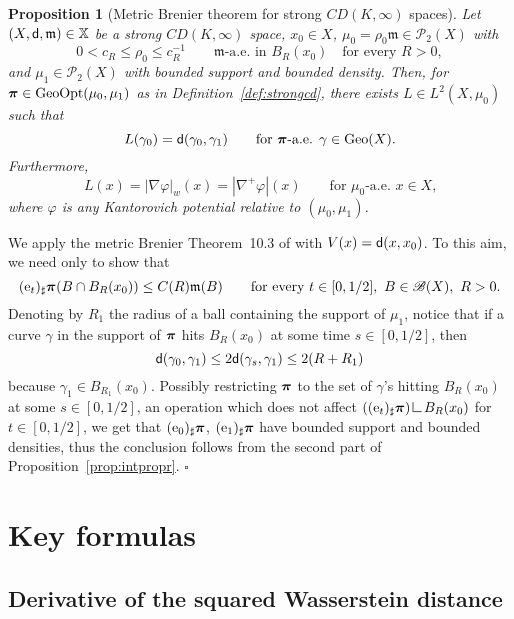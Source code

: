 \documentclass[reqno,11pt]{article}
\numberwithin{equation}{section}
\newcommand{\BB}{\mathscr{B}}
\newcommand{\mm}{{\mbox{\boldmath$m$}}}
\newcommand{\ppi}{{\mbox{\boldmath$\pi$}}}
\newcommand{\sfd}{{\sf d}}
\newcommand{\forevery}{\text{for every }}
\newcommand{\BorelSets}[1]{\BB(#1)}
\newcommand{\ProbabilitiesTwo}[1]{\mathscr P_2(#1)}     %
\newenvironment{proof}{\removelastskip\par\medskip   %
\noindent{\em Proof.}
\rm}{\penalty-20\null\hfill$\square$\par\medbreak}
\newtheorem{proposition}[theorem]{Proposition}
\newcommand{\probt}{\ProbabilitiesTwo}
\newcommand{\geo}{{\rm{Geo}}}                       %
\newcommand{\e}{{\rm{e}}}                           %
\newcommand{\gopt}{{\rm{GeoOpt}}}                   %
\newcommand{\X}{\mathbb X}
\newcommand{\weakgrad}[1]{|\nabla #1|_w}                %
\newcommand{\res}{\mathop{\hbox{\vrule height 7pt width .5pt depth 0pt
\vrule height .5pt width 6pt depth 0pt}}\nolimits} %
\renewcommand{\mm}{\mathfrak m}
\begin{document}
\begin{proposition}[Metric Brenier theorem for strong $CD(K,\infty)$ spaces]\label{prop:brenierbip}
Let $(X,\sfd,\mm)\in\X$ be a strong $CD(K,\infty)$ space, $x_0\in
X$, $\mu_0=\rho_0\mm\in\probt X$ with
\begin{equation}
  \label{eq:13}
  0<c_R\le \rho_0\le c_R^{-1}\qquad\text{$\mm$-a.e.\ in
  }B_R(x_0)\quad\forevery R>0,
\end{equation}
and $\mu_1\in\probt X$ with bounded support and bounded density.
Then, for $\ppi\in\gopt{(\mu_0,\mu_1)}$ as in
Definition~\ref{def:strongcd}, there exists $L\in L^2(X,\mu_0)$ such
that
\[
L(\gamma_0)=\sfd(\gamma_0,\gamma_1)\qquad\text{for $\ppi$-a.e.
$\gamma\in\geo(X)$.}
\]
Furthermore,
$$L(x)=\weakgrad\varphi(x)=|\nabla^+\varphi|(x)\qquad\text{for $\mu_0$-a.e.~$x\in X$,}$$
where $\varphi$ is any Kantorovich potential relative to
$(\mu_0,\mu_1)$.
\end{proposition}
\begin{proof}
We apply the metric Brenier Theorem~10.3 of
\cite{Ambrosio-Gigli-Savare11} with $V(x)=\sfd(x,x_0)$. To this aim,
we need only to show that
\begin{equation}\label{eq:boundlinfty1}
(\e_t)_\sharp\ppi(B\cap B_R(x_0))\leq C(R)\mm(B)\qquad\forevery t\in
[0, 1/2],\,\,B\in\BorelSets{X},\ R>0.
\end{equation}
Denoting by $R_1$ the radius of a ball containing the
support of $\mu_1$, notice that if a curve $\gamma$ in the support of
$\ppi$ hits $B_R(x_0)$ at some time $s\in [0,1/2]$, then
$$
\sfd(\gamma_0,\gamma_1)\leq 2\sfd(\gamma_s,\gamma_1)\leq 2(R+R_1)
$$
because $\gamma_1\in B_{R_1}(x_0)$. Possibly restricting $\ppi$ to
the set of $\gamma$'s hitting $B_R(x_0)$ at some $s\in[0,1/2]$, an
operation which does not affect $((\e_t)_\sharp\ppi)\res B_R(x_0)$
for $t\in [0,1/2]$, we get that $(\e_0)_\sharp\ppi$,
$(\e_1)_\sharp\ppi$ have bounded support and bounded densities, thus
the conclusion follows from the second part of
Proposition~\ref{prop:intpropr}.
\end{proof}

\section{Key formulas}\label{se:formule}

\subsection{Derivative of the squared Wasserstein
distance}\label{sub5}
\end{document}
